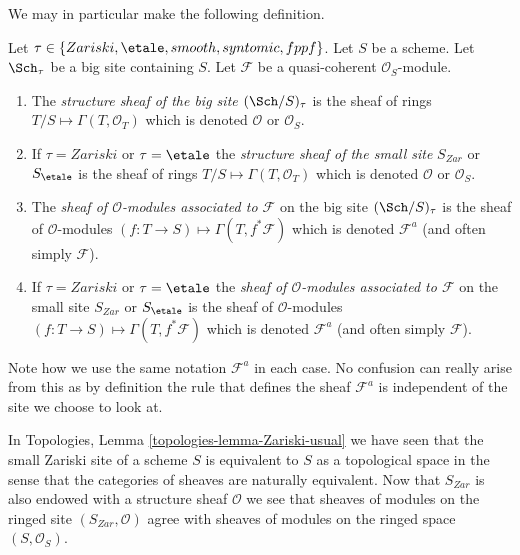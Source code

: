 \noindent
We may in particular make the following definition.

\begin{definition}
\label{definition-structure-sheaf}
Let $\tau \in \{Zariski, \linebreak[0] \etale, \linebreak[0]
smooth, \linebreak[0] syntomic, \linebreak[0] fppf\}$.
Let $S$ be a scheme.
Let $\Sch_\tau$ be a big site containing $S$.
Let $\mathcal{F}$ be a quasi-coherent $\mathcal{O}_S$-module.
\begin{enumerate}
\item The {\it structure sheaf of the big site $(\Sch/S)_\tau$}
is the sheaf of rings $T/S \mapsto \Gamma(T, \mathcal{O}_T)$ which is
denoted $\mathcal{O}$ or $\mathcal{O}_S$.
\item If $\tau = Zariski$ or $\tau = \etale$ the
{\it structure sheaf of the small site} $S_{Zar}$ or $S_\etale$
is the sheaf of rings $T/S \mapsto \Gamma(T, \mathcal{O}_T)$
which is denoted $\mathcal{O}$ or $\mathcal{O}_S$.
\item The {\it sheaf of $\mathcal{O}$-modules associated to
$\mathcal{F}$} on the big site $(\Sch/S)_\tau$
is the sheaf of $\mathcal{O}$-modules
$(f : T \to S) \mapsto \Gamma(T, f^*\mathcal{F})$
which is denoted $\mathcal{F}^a$ (and often simply $\mathcal{F}$).
\item If $\tau = Zariski$ or $\tau = \etale$ the
{\it sheaf of $\mathcal{O}$-modules associated to $\mathcal{F}$}
on the small site $S_{Zar}$ or $S_\etale$ is the sheaf of
$\mathcal{O}$-modules $(f : T \to S) \mapsto \Gamma(T, f^*\mathcal{F})$
which is denoted $\mathcal{F}^a$ (and often simply $\mathcal{F}$).
\end{enumerate}
\end{definition}

\noindent
Note how we use the same notation $\mathcal{F}^a$ in each case.
No confusion can really arise from this as by definition the rule
that defines the sheaf $\mathcal{F}^a$ is independent of the site
we choose to look at.

\begin{remark}
\label{remark-Zariski-site-space}
In Topologies, Lemma \ref{topologies-lemma-Zariski-usual}
we have seen that the small Zariski site of a scheme $S$ is
equivalent to $S$ as a topological space in the sense that the
categories of sheaves are naturally equivalent. Now that $S_{Zar}$
is also endowed with a structure sheaf $\mathcal{O}$ we see
that sheaves of modules on the ringed site $(S_{Zar}, \mathcal{O})$
agree with sheaves of modules on the ringed space $(S, \mathcal{O}_S)$.
\end{remark}

